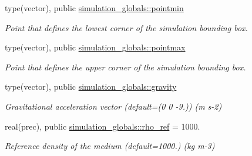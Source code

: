 \begin{DoxyCompactItemize}
type(vector), public \mbox{\hyperlink{namespacesimulation__globals_ab2427b2b4beb2d54ecc2b61862c09dcf}{simulation\+\_\+globals\+::pointmin}}
\begin{DoxyCompactList}\small\item\em Point that defines the lowest corner of the simulation bounding box. \end{DoxyCompactList}\item 
type(vector), public \mbox{\hyperlink{namespacesimulation__globals_aa7feec60259c6f63f3dba3a523ed5a60}{simulation\+\_\+globals\+::pointmax}}
\begin{DoxyCompactList}\small\item\em Point that defines the upper corner of the simulation bounding box. \end{DoxyCompactList}\item 
type(vector), public \mbox{\hyperlink{namespacesimulation__globals_a7308742dbca1348161d6cb02a06aa2a2}{simulation\+\_\+globals\+::gravity}}
\begin{DoxyCompactList}\small\item\em Gravitational acceleration vector (default=(0 0 -\/9.)) (m s-\/2) \end{DoxyCompactList}\item 
real(prec), public \mbox{\hyperlink{namespacesimulation__globals_a401ef3172f26620b9e089d7b297b36a0}{simulation\+\_\+globals\+::rho\+\_\+ref}} = 1000.
\begin{DoxyCompactList}\small\item\em Reference density of the medium (default=1000.) (kg m-\/3) \end{DoxyCompactList}\end{DoxyCompactItemize}
